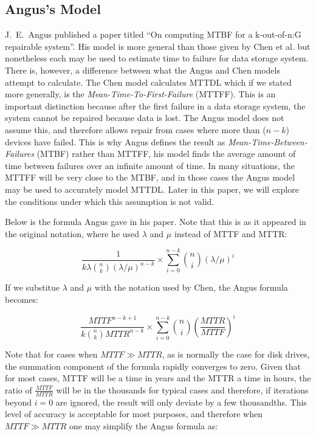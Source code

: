 \documentclass[XXX,endnotes]{usetex-v1}
\begin{document}
\subsection{Angus's Model}

J.~E.~Angus published a paper titled ``On computing MTBF for a k-out-of-n:G repairable system''\cite{markov}.  His model is more general than those given by Chen et al. but nonetheless each may be used to estimate time to failure for data storage system.  There is, however, a difference between what the Angus and Chen models attempt to calculate.  The Chen model calculates MTTDL which if we stated more generally, is the \emph{Mean-Time-To-First-Failure} (MTTFF).  This is an important distinction because after the first failure in a data storage system, the system cannot be repaired because data is lost.  The Angus model does not assume this, and therefore allows repair from cases where more than ($n-k$) devices have failed.  This is why Angus defines the result as \emph{Mean-Time-Between-Failures} (MTBF) rather than MTTFF, his model finds the average amount of time between failures over an infinite amount of time.  In many situations, the MTTFF will be very close to the MTBF, and in those cases the Angus model may be used to accurately model MTTDL.  Later in this paper, we will explore the conditions under which this assumption is not valid.

Below is the formula Angus gave in his paper.  Note that this is as it appeared in the original notation, where he used $\lambda$ and $\mu$ instead of MTTF and MTTR:

$$\frac{1}{k\lambda {{n}\choose{k}} (\lambda/\mu)^{n-k}} \times \sum_{i=0}^{n-k} {{n}\choose{i}} (\lambda/\mu)^{i}$$

If we substitue $\lambda$ and $\mu$ with the notation used by Chen, the Angus formula becomes:

$$\frac{MTTF^{n-k+1}}{k {{n}\choose{k}} MTTR^{n-k}} \times \sum_{i=0}^{n-k} {{n}\choose{i}} \left(\frac{MTTR}{MTTF}\right)^{i}$$

Note that for cases when $MTTF \gg MTTR$, as is normally the case for disk drives, the summation component of the formula rapidly converges to zero.  Given that for most cases, MTTF will be a time in years and the MTTR a time in hours, the ratio of $\frac{MTTF}{MTTR}$ will be in the thousands for typical cases and therefore, if iterations beyond $i = 0$ are ignored, the result will only deviate by a few thousandths.  This level of accuracy is acceptable for most purposes, and therefore when $MTTF \gg MTTR$ one may simplify the Angus formula as:
\end{document}
